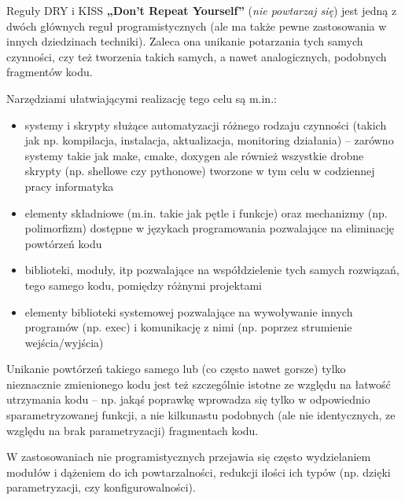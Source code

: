 \begin{ProTip}[breakable]{Reguły DRY i KISS}
\textbf{„Don't Repeat Yourself”} (\textit{nie powtarzaj się}) jest jedną z dwóch głównych reguł programistycznych (ale ma także pewne zastosowania w innych dziedzinach techniki).
Zaleca ona unikanie potarzania tych samych czynności, czy też tworzenia takich samych, a nawet analogicznych, podobnych fragmentów kodu.

Narzędziami ułatwiającymi realizację tego celu są m.in.:
\begin{itemize}
\item systemy i skrypty służące automatyzacji różnego rodzaju czynności (takich jak np. kompilacja, instalacja, aktualizacja, monitoring działania) –
      zarówno systemy takie jak make, cmake, doxygen ale również wszystkie drobne skrypty (np. shellowe czy pythonowe) tworzone w tym celu w codziennej pracy informatyka
\item elementy składniowe (m.in. takie jak pętle i funkcje) oraz mechanizmy (np. polimorfizm) dostępne w językach programowania pozwalające na eliminację powtórzeń kodu
\item biblioteki, moduły, itp pozwalające na współdzielenie tych samych rozwiązań, tego samego kodu, pomiędzy różnymi projektami
\item elementy biblioteki systemowej pozwalające na wywoływanie innych programów (np. exec) i komunikację z nimi (np. poprzez strumienie wejścia/wyjścia)
\end{itemize}

Unikanie powtórzeń takiego samego lub (co często nawet gorsze) tylko nieznacznie zmienionego kodu jest też szczególnie istotne ze względu na łatwość utrzymania kodu
– np. jakąś poprawkę wprowadza się tylko w odpowiednio sparametryzowanej funkcji, a nie kilkunastu podobnych (ale nie identycznych, ze względu na brak parametryzacji) fragmentach kodu.

W zastosowaniach nie programistycznych przejawia się często wydzielaniem modułów i dążeniem do ich powtarzalności, redukcji ilości ich typów (np. dzięki parametryzacji, czy konfigurowalności).

\vspace{7pt}


\end{ProTip}
